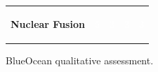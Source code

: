 \documentclass[10pt,a4paper]{article}
\begin{document}
{\begin{tabular}{p{38mm}>{\centering\arraybackslash}p{21mm}>{\centering\arraybackslash}p{21mm}>{\centering\arraybackslash}p{21mm}>{\centering\arraybackslash}p{21mm}}
{\bfseries Nuclear Fusion} & \colorbox{BOGreen}{\textcolor{white}{\strut\hspace{5pt}5\hspace{5pt}}} & \colorbox{BOBlue}{\textcolor{white}{\strut\hspace{5pt}3\hspace{5pt}}} & \colorbox{BOBlue}{\textcolor{white}{\strut\hspace{5pt}3\hspace{5pt}}} & \colorbox{BOBlue}{\textcolor{white}{\strut\hspace{5pt}3\hspace{5pt}}} \\
\end{tabular}}\par\vspace{2pt}
\par
{\scriptsize\color{BOMuted} BlueOcean qualitative assessment.}\par
\end{document}

